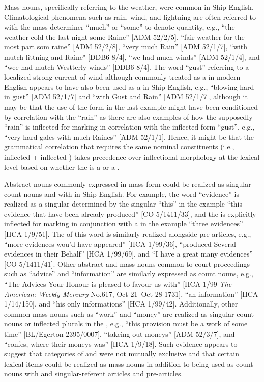 Mass nouns, specifically referring to the weather, were common in Ship English. Climatological phenomena such as rain, wind, and lightning are often referred to with the mass determiner “much” or “some” to denote quantity, e.g., “the weather cold the last night some Raine” [ADM 52/2/5], “fair weather for the most part som raine” [ADM 52/2/8], “very much Rain” [ADM 52/1/7], “with mutch littning and Raine" [DDB6 8/4], “we had much winds” [ADM 52/1/4], and “wee had mutch Westterly winds” [DDB6 8/4]. The word “gust” referring to a localized strong current of wind although commonly treated as a  in modern English appears to have also been used as a  in Ship English, e.g., “blowing hard in gust” [ADM 52/1/7] and “with Gust and Rain” [ADM 52/1/7], although it may be that the use of the  form in the last example might have been conditioned by correlation with the  “rain” as there are also examples of how the supposedly  “rain” is inflected for  marking in correlation with the inflected form “gust”, e.g., “very hard gales with much Raines” [ADM 52/1/1]. Hence, it might be that the grammatical correlation that requires the same nominal constituents (i.e., inflected  + inflected ) takes precedence over inflectional morphology at the lexical level based on whether the  is a  or a . 

Abstract nouns commonly expressed in mass form could be realized as singular count nouns and with  in Ship English. For example, the word “evidence” is realized as a singular  determined by the singular  “this” in the example “this evidence that have been already produced” [CO 5/1411/33], and the  is explicitly inflected for  marking in conjunction with a  in the example “three evidences” [HCA 1/9/51]. The  of this word is similarly realized alongside  pre-articles, e.g., “more evidences wou’d have appeared” [HCA 1/99/36], “produced Several evidences in their Behalf” [HCA 1/99/69], and “I have a great many evidences” [CO 5/1411/41]. Other abstract and mass nouns common to court proceedings such as “advice” and “information” are similarly expressed as count nouns, e.g., “The Advices Your Honour is pleased to favour us with” [HCA 1/99 \textit{The American: Weekly Mercury} No.617, Oct 21–Oct 28 1731], “an information” [HCA 1/14/150], and “his only informations” [HCA 1/99/42]. Additionally, other common mass nouns such as “work” and “money” are realized as singular count nouns or inflected plurals in the , e.g., “this provision must be a work of some time” [BL/Egerton 2395/0007], “takeing out moneys” [ADM 52/3/7], and “confes, where their moneys was” [HCA 1/9/18]. Such evidence appears to suggest that categories of  and  were not mutually exclusive and that certain lexical items could be realized as  mass nouns in addition to being used as count nouns with  and singular-referent articles and pre-articles. 

